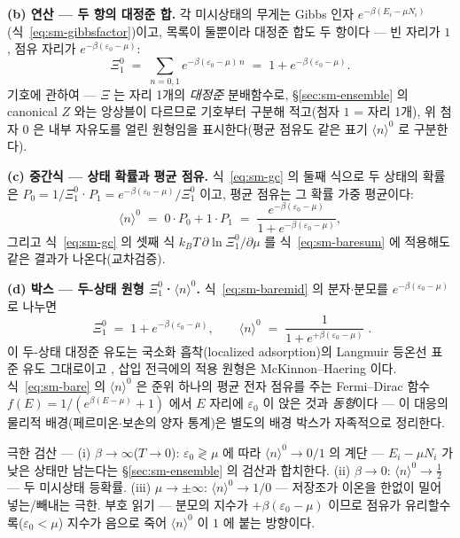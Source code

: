 \textbf{(b) 연산 --- 두 항의 대정준 합.} 각 미시상태의 무게는 Gibbs 인자
$e^{-\beta(E_i-\mu N_i)}$(식~\eqref{eq:sm-gibbsfactor})이고, 목록이 둘뿐이라 대정준 합도 두 항이다 ---
빈 자리가 $1$, 점유 자리가 $e^{-\beta(\varepsilon_0-\mu)}$:
\begin{equation}
\Xi_1^{0}\;=\;\sum_{n=0,1}e^{-\beta(\varepsilon_0-\mu)\,n}
\;=\;1+e^{-\beta(\varepsilon_0-\mu)}.
\label{eq:sm-baresum}
\end{equation}
기호에 관하여 --- $\Xi$ 는 자리 1개의 \emph{대정준} 분배함수로, \S\ref{sec:sm-ensemble} 의 canonical
$Z$ 와는 앙상블이 다르므로 기호부터 구분해 적고(첨자 $1$ = 자리 1개), 위 첨자 $0$ 은 내부 자유도를 얼린
원형임을 표시한다(평균 점유도 같은 표기 $\langle n\rangle^{0}$ 로 구분한다).

\textbf{(c) 중간식 --- 상태 확률과 평균 점유.} 식~\eqref{eq:sm-gc} 의 둘째 식으로 두 상태의 확률은
$P_0=1/\Xi_1^{0}$·$P_1=e^{-\beta(\varepsilon_0-\mu)}/\Xi_1^{0}$ 이고, 평균 점유는 그 확률 가중 평균이다:
\begin{equation}
\langle n\rangle^{0}
\;=\;0\cdot P_0+1\cdot P_1
\;=\;\frac{e^{-\beta(\varepsilon_0-\mu)}}{1+e^{-\beta(\varepsilon_0-\mu)}},
\label{eq:sm-baremid}
\end{equation}
그리고 식~\eqref{eq:sm-gc} 의 셋째 식 $k_BT\,\partial\ln\Xi_1^{0}/\partial\mu$ 를
식~\eqref{eq:sm-baresum} 에 적용해도 같은 결과가 나온다(교차검증).

\textbf{(d) 박스 --- 두-상태 원형 $\Xi_1^{0}$·$\langle n\rangle^{0}$.} 식~\eqref{eq:sm-baremid} 의
분자$\cdot$분모를 $e^{-\beta(\varepsilon_0-\mu)}$ 로 나누면
\begin{equation}
\boxed{\;\Xi_1^{0}\;=\;1+e^{-\beta(\varepsilon_0-\mu)},\qquad
\langle n\rangle^{0}\;=\;\frac{1}{1+e^{+\beta(\varepsilon_0-\mu)}}\;.}
\label{eq:sm-bare}
\end{equation}
이 두-상태 대정준 유도는 국소화 흡착(localized adsorption)의 Langmuir 등온선 표준 유도
그대로이고 \cite{hill1960,fowler1939}, 삽입 전극에의 적용 원형은 McKinnon--Haering
\cite{mckinnon1983} 이다. 식~\eqref{eq:sm-bare} 의 $\langle n\rangle^{0}$ 은 준위 하나의 평균 전자 점유를
주는 Fermi--Dirac 함수 $f(E)=1/(e^{\beta(E-\mu)}+1)$ 에서 $E$ 자리에 $\varepsilon_0$ 이 앉은 것과
\emph{동형}이다 --- 이 대응의 물리적 배경(페르미온$\cdot$보손의 양자 통계)은 별도의 배경 박스가
자족적으로 정리한다.
\begin{verifybox}
극한 검산 --- (i) $\beta\to\infty$($T\to0$): $\varepsilon_0\gtrless\mu$ 에 따라 $\langle n\rangle^{0}\to0/1$
의 계단 --- $E_i-\mu N_i$ 가 낮은 상태만 남는다는 \S\ref{sec:sm-ensemble} 의 검산과 합치한다.
(ii) $\beta\to0$: $\langle n\rangle^{0}\to\tfrac12$ --- 두 미시상태 등확률. (iii) $\mu\to\pm\infty$:
$\langle n\rangle^{0}\to1/0$ --- 저장조가 이온을 한없이 밀어 넣는/빼내는 극한. 부호 읽기 --- 분모의 지수가
$+\beta(\varepsilon_0-\mu)$ 이므로 점유가 유리할수록($\varepsilon_0<\mu$) 지수가 음으로 죽어
$\langle n\rangle^{0}$ 이 $1$ 에 붙는 방향이다.
\end{verifybox}

